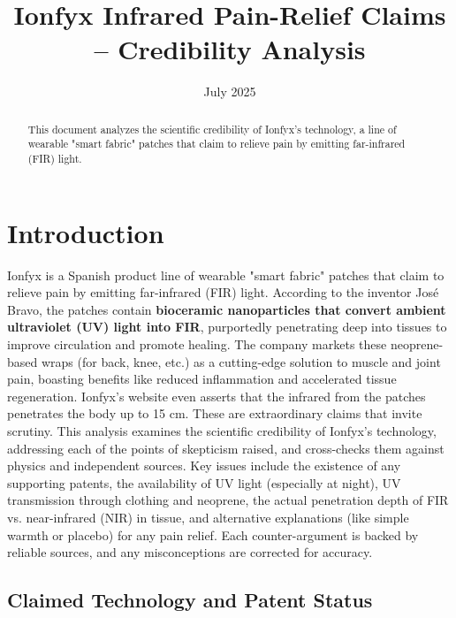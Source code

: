 \documentclass{article}
\title{Ionfyx Infrared Pain-Relief Claims – Credibility Analysis}
\author{}
\date{July 2025}
\begin{document}
\maketitle

\begin{abstract}
This document analyzes the scientific credibility of Ionfyx's technology, a line of wearable "smart fabric" patches that claim to relieve pain by emitting far-infrared (FIR) light.
\end{abstract}

\section{Introduction}

Ionfyx is a Spanish product line of wearable "smart fabric" patches that claim to relieve pain by emitting far-infrared (FIR) light. According to the inventor José Bravo, the patches contain \textbf{bioceramic nanoparticles that convert ambient ultraviolet (UV) light into FIR}, purportedly penetrating deep into tissues to improve circulation and promote healing. The company markets these neoprene-based wraps (for back, knee, etc.) as a cutting-edge solution to muscle and joint pain, boasting benefits like reduced inflammation and accelerated tissue regeneration. Ionfyx's website even asserts that the infrared from the patches penetrates the body up to 15 cm. These are extraordinary claims that invite scrutiny. This analysis examines the scientific credibility of Ionfyx's technology, addressing each of the points of skepticism raised, and cross-checks them against physics and independent sources. Key issues include the existence of any supporting patents, the availability of UV light (especially at night), UV transmission through clothing and neoprene, the actual penetration depth of FIR vs. near-infrared (NIR) in tissue, and alternative explanations (like simple warmth or placebo) for any pain relief. Each counter-argument is backed by reliable sources, and any misconceptions are corrected for accuracy.

\subsection{Claimed Technology and Patent Status}
\end{document}
